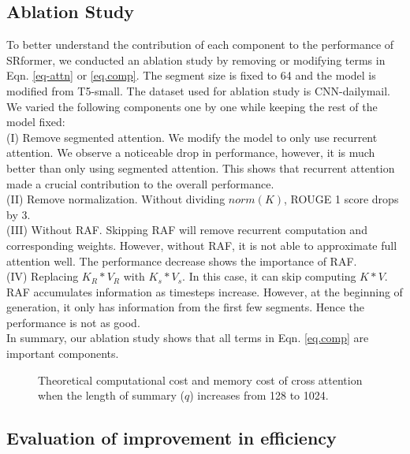 \documentclass[11pt]{article}
\begin{document}
\subsection{Ablation Study}
To better understand the contribution of each component to the performance of SRformer, we conducted an ablation study by removing or modifying terms in Eqn. \ref{eq-attn} or \ref{eq.comp}.
The segment size is fixed to 64 and the model is modified from T5-small. The dataset used for ablation study is CNN-dailymail. We varied the following components one by one while keeping the rest of the model fixed:\\
(I) Remove segmented attention. 
We modify the model to only use recurrent attention. We observe a noticeable drop in performance, however, it is much better than only using segmented attention. This shows that recurrent attention made a crucial contribution to the overall performance.\\
(II) Remove normalization.
Without dividing $norm(K)$, ROUGE 1 score drops by 3.\\
(III) Without RAF.
Skipping RAF will remove recurrent computation and corresponding weights. However, without RAF, it is not able to approximate full attention well. The performance decrease shows the importance of RAF.\\
(IV) Replacing $K_R *V_R$ with $K_s *V_s$. In this case, it can skip computing $K*V$. RAF accumulates information as timesteps increase. However, at the beginning of generation, it only has information from the first few segments. Hence the performance is not as good.\\
In summary, our ablation study shows that all terms in Eqn. \ref{eq.comp} are important components.

\begin{figure*}[htbp]
    \centering
    \qquad
    \caption{Theoretical computational cost and memory cost of cross attention when the length of summary ($q$) increases from 128 to 1024. }\label{fig:cost}\end{figure*}
\subsection{Evaluation of improvement in efficiency}
\end{document}
